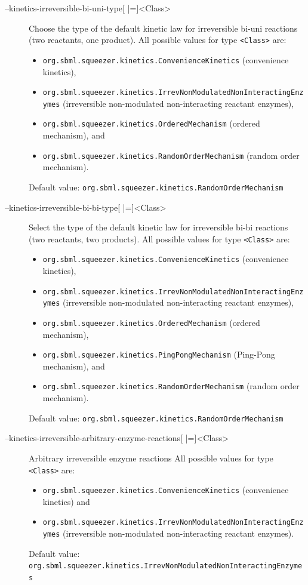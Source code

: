\begin{description}
\item[--kinetics-irreversible-bi-uni-type{[} |={]}<Class>]
  Choose the type of the default kinetic law for irreversible bi-uni
  reactions (two reactants, one product).
  All possible values for type \texttt{<Class>} are:
  \begin{itemize}
  \item\texttt{org.sbml.squeezer.kinetics.ConvenienceKinetics} (convenience kinetics),
  \item\texttt{org.sbml.squeezer.kinetics.IrrevNonModulatedNonInteractingEnzymes} (irreversible non-modulated non-interacting reactant enzymes),
  \item\texttt{org.sbml.squeezer.kinetics.OrderedMechanism} (ordered mechanism), and
  \item\texttt{org.sbml.squeezer.kinetics.RandomOrderMechanism} (random order mechanism).
  \end{itemize}
  Default value: \texttt{org.sbml.squeezer.kinetics.RandomOrderMechanism}

\item[--kinetics-irreversible-bi-bi-type{[} |={]}<Class>]
  Select the type of the default kinetic law for irreversible bi-bi
  reactions (two reactants, two products).
  All possible values for type \texttt{<Class>} are:
  \begin{itemize}
  \item\texttt{org.sbml.squeezer.kinetics.ConvenienceKinetics} (convenience kinetics),
  \item\texttt{org.sbml.squeezer.kinetics.IrrevNonModulatedNonInteractingEnzymes} (irreversible non-modulated non-interacting reactant enzymes),
  \item\texttt{org.sbml.squeezer.kinetics.OrderedMechanism} (ordered mechanism),
  \item\texttt{org.sbml.squeezer.kinetics.PingPongMechanism} (Ping-Pong mechanism), and
  \item\texttt{org.sbml.squeezer.kinetics.RandomOrderMechanism} (random order mechanism).
  \end{itemize}
  Default value: \texttt{org.sbml.squeezer.kinetics.RandomOrderMechanism}

\item[--kinetics-irreversible-arbitrary-enzyme-reactions{[} |={]}<Class>]
  Arbitrary irreversible enzyme reactions
  All possible values for type \texttt{<Class>} are:
  \begin{itemize}
  \item\texttt{org.sbml.squeezer.kinetics.ConvenienceKinetics} (convenience kinetics) and
  \item\texttt{org.sbml.squeezer.kinetics.IrrevNonModulatedNonInteractingEnzymes} (irreversible non-modulated non-interacting reactant enzymes).
  \end{itemize}
  Default value:
  \texttt{org.sbml.squeezer.kinetics.IrrevNonModulatedNonInteractingEnzymes}
\end{description}

